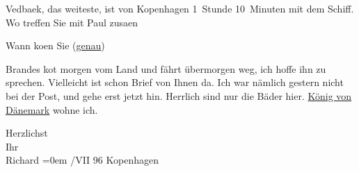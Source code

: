 \pstart
           {\pb}Vedbaek, das weiteste, ist von Kopenhagen 1 Stunde 10 Minuten mit dem Schiff.
               Wo treffen Sie mit Paul zusa{\geminationm}en\pend
           
\pstart
           Wann ko{\geminationm}en Sie (\uline{genau})\pend
           
\pstart
           Brandes ko{\geminationm}t
               morgen vom Land und fährt übermorgen weg, ich hoffe ihn zu sprechen. Vielleicht ist
               schon Brief von Ihnen da. {\pb}Ich war
               nämlich gestern nicht bei der Post, und gehe erst jetzt hin. Herrlich sind nur die
               Bäder hier. \uline{König von Dänemark} wohne ich.\pend
           
\pstart
           Herzlichst{\\[\baselineskip]}Ihr{\\[\baselineskip]}\spacefill\mbox{Richard}\pend
           \leftskip=0em{}
/VII 96{ }Kopenhagen\pend
           \endnumbering{}  \newcommand{\dateiname}{L00570}\newcommand{\titel}{Richard Beer-Hofmann an Arthur Schnitzler, 28. 7. 1896}\newcommand{\editorInnen}{Martin Anton Müller und Gerd-Hermann Susen}
